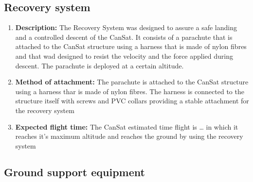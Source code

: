 \documentclass[11pt]{article}
\begin{document}
\subsection{Recovery system}
\begin{enumerate}
\item \textbf{Description:} The Recovery System was designed to assure a safe landing and a controlled descent of the CanSat. It consists of a parachute that is attached to the CanSat structure using a harness that is made of nylon fibres and that wad designed to resist the velocity and the force applied during descent. The parachute is deployed at a certain altitude.
\vspace{0.25cm}
\item \textbf{Method of attachment:} The parachute is attached to the CanSat structure using a harness thar is made of nylon fibres. The harness is connected to the structure itself with screws and PVC collars providing a stable attachment for the recovery system
\vspace{0.25cm}
\item \textbf{Expected flight time:} The CanSat estimated time flight is … in which it reaches it's maximum altitude and reaches the ground by using the recovery system

\end{enumerate}

\subsection{Ground support equipment}



\end{document}
